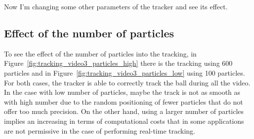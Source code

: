 \documentclass{ethz_report}
\begin{document}
Now I'm changing some other parameters of the tracker and see its effect.

\subsection*{Effect of the number of particles}

To see the effect of the number of particles into the tracking, in Figure~\ref{fig:tracking_video3_particles_high} there is the tracking using 600 particles and in Figure~\ref{fig:tracking_video3_particles_low} using 100 particles. For both cases, the tracker is able to correctly track the ball during all the video.
In the case with low number of particles, maybe the track is not as smooth as with high number due to the random positioning of fewer particles that do not offer too much precision. On the other hand, using a larger number of particles implies an increasing in terms of computational costs that in some applications are not permissive in the case of performing real-time tracking.
\end{document}
